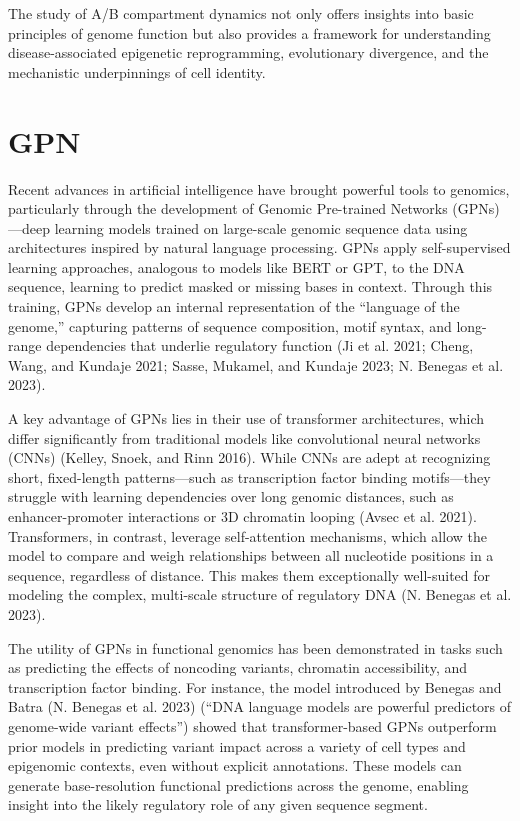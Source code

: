 \documentclass[
  a4paper,
  openany]{scrbook}
\begin{document}
The study of A/B compartment dynamics not only offers insights into
basic principles of genome function but also provides a framework for
understanding disease-associated epigenetic reprogramming, evolutionary
divergence, and the mechanistic underpinnings of cell identity.

\section{GPN}\label{gpn}

Recent advances in artificial intelligence have brought powerful tools
to genomics, particularly through the development of Genomic Pre-trained
Networks (GPNs)---deep learning models trained on large-scale genomic
sequence data using architectures inspired by natural language
processing. GPNs apply self-supervised learning approaches, analogous to
models like BERT or GPT, to the DNA sequence, learning to predict masked
or missing bases in context. Through this training, GPNs develop an
internal representation of the ``language of the genome,'' capturing
patterns of sequence composition, motif syntax, and long-range
dependencies that underlie regulatory function (Ji et al. 2021; Cheng,
Wang, and Kundaje 2021; Sasse, Mukamel, and Kundaje 2023; N. Benegas et
al. 2023).

A key advantage of GPNs lies in their use of transformer architectures,
which differ significantly from traditional models like convolutional
neural networks (CNNs) (Kelley, Snoek, and Rinn 2016). While CNNs are
adept at recognizing short, fixed-length patterns---such as
transcription factor binding motifs---they struggle with learning
dependencies over long genomic distances, such as enhancer-promoter
interactions or 3D chromatin looping (Avsec et al. 2021). Transformers,
in contrast, leverage self-attention mechanisms, which allow the model
to compare and weigh relationships between all nucleotide positions in a
sequence, regardless of distance. This makes them exceptionally
well-suited for modeling the complex, multi-scale structure of
regulatory DNA (N. Benegas et al. 2023).

The utility of GPNs in functional genomics has been demonstrated in
tasks such as predicting the effects of noncoding variants, chromatin
accessibility, and transcription factor binding. For instance, the model
introduced by Benegas and Batra (N. Benegas et al. 2023) (``DNA language
models are powerful predictors of genome-wide variant effects'') showed
that transformer-based GPNs outperform prior models in predicting
variant impact across a variety of cell types and epigenomic contexts,
even without explicit annotations. These models can generate
base-resolution functional predictions across the genome, enabling
insight into the likely regulatory role of any given sequence segment.
\end{document}
